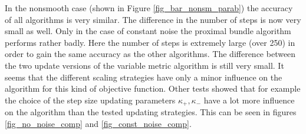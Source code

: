 In the nonsmooth case (shown in Figure \ref{fig_bar_nonsm_parab}) the accuracy of all algorithms is very similar. The difference in the number of steps is now very small as well.
Only in the case of constant noise the proximal bundle algorithm performs rather badly. Here the number of steps is extremely large (over 250) in order to gain the same accuracy as the other algorithms.
The difference between the two update versions of the variable metric algorithm is still very small. It seems that the different scaling strategies have only a minor influence on the algorithm for this kind of objective function. Other tests showed that for example the choice of the step size updating parameters \(\kappa_+, \kappa_-\) have a lot more influence on the algorithm than the tested updating strategies. This can be seen in figures \ref{fig_no_noise_comp}  and \ref{fig_const_noise_comp}.%





